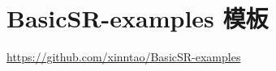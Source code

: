 \documentclass[../main.tex]{subfiles}
\begin{document}
\chapter{BasicSR-examples 模板}\label{chapter:template}
\vspace{-2cm}

\url{https://github.com/xinntao/BasicSR-examples}
\end{document}
